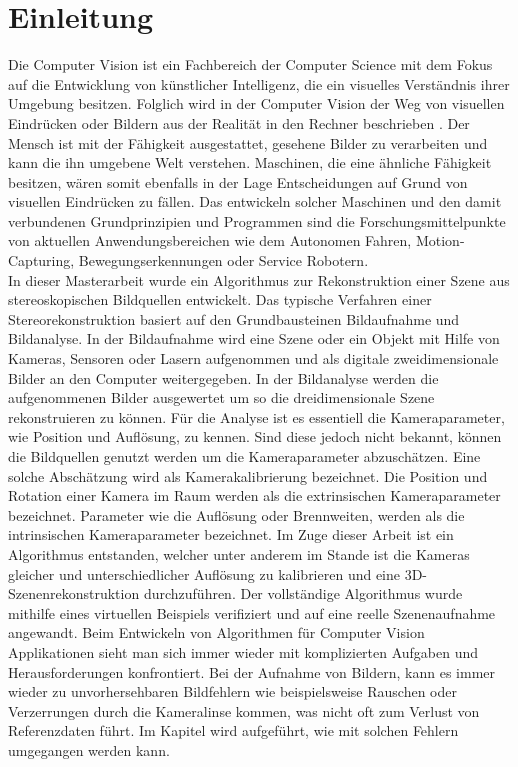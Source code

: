 \chapter{Einleitung}
\label{sec:einleitung} 




Die Computer Vision ist ein Fachbereich der Computer Science mit dem Fokus auf die Entwicklung von künstlicher Intelligenz, die ein visuelles Verständnis ihrer Umgebung besitzen. Folglich wird in der Computer Vision der Weg von visuellen Eindrücken oder Bildern aus der Realität in den Rechner beschrieben \cite{ComputerVision}. Der Mensch ist mit der Fähigkeit ausgestattet, gesehene Bilder zu verarbeiten und  kann die ihn umgebene Welt verstehen. Maschinen, die eine ähnliche Fähigkeit besitzen, wären somit ebenfalls in der Lage Entscheidungen auf Grund von visuellen Eindrücken zu fällen. Das entwickeln solcher Maschinen und den damit verbundenen Grundprinzipien und Programmen sind die Forschungsmittelpunkte von aktuellen Anwendungsbereichen wie dem Autonomen Fahren, Motion-Capturing, Bewegungserkennungen oder Service Robotern.\\

In dieser Masterarbeit wurde ein Algorithmus zur Rekonstruktion einer Szene aus stereoskopischen Bildquellen entwickelt. Das typische Verfahren einer Stereorekonstruktion basiert auf den Grundbausteinen Bildaufnahme und Bildanalyse\cite{ComputerVision}. In der Bildaufnahme wird eine Szene oder ein Objekt mit Hilfe von Kameras, Sensoren oder Lasern aufgenommen und als digitale zweidimensionale Bilder an den Computer weitergegeben. In der Bildanalyse werden die aufgenommenen Bilder ausgewertet um so die dreidimensionale Szene rekonstruieren zu können. Für die Analyse ist es essentiell die Kameraparameter, wie Position und Auflösung, zu kennen. Sind diese jedoch nicht bekannt, können die Bildquellen genutzt werden um die Kameraparameter abzuschätzen. Eine solche Abschätzung wird als Kamerakalibrierung\cite{HZ,Ferid,Elements,ZZGXr} bezeichnet. Die Position und Rotation einer Kamera im Raum werden als die extrinsischen Kameraparameter bezeichnet. Parameter wie die Auflösung oder Brennweiten, werden als die intrinsischen Kameraparameter bezeichnet\cite{HZ,Ferid}. Im Zuge dieser Arbeit ist ein Algorithmus entstanden, welcher unter anderem im Stande ist die Kameras gleicher und unterschiedlicher Auflösung zu kalibrieren und eine 3D-Szenenrekonstruktion durchzuführen. Der vollständige Algorithmus wurde mithilfe eines virtuellen Beispiels verifiziert und auf eine reelle Szenenaufnahme angewandt. Beim Entwickeln von Algorithmen für Computer Vision Applikationen sieht man sich immer wieder mit komplizierten Aufgaben und Herausforderungen konfrontiert. Bei der Aufnahme von Bildern, kann es immer wieder zu unvorhersehbaren Bildfehlern wie beispielsweise Rauschen oder Verzerrungen durch die Kameralinse kommen, was nicht oft zum Verlust von Referenzdaten führt. Im Kapitel  wird aufgeführt, wie mit solchen Fehlern umgegangen werden kann.\\

